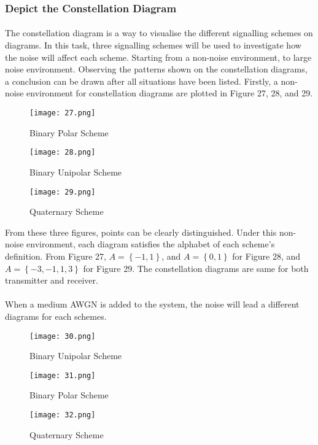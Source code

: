 \documentclass[12pt]{article}
\begin{document}
    \subsubsection{Depict the Constellation Diagram}
    \paragraph{}
    The constellation diagram is a way to visualise the different signalling schemes on diagrams. In this task, three signalling schemes will be used to investigate how the noise will affect each scheme. Starting from a non-noise environment, to large noise environment. Observing the patterns shown on the constellation diagrams, a conclusion can be drawn after all situations have been listed. Firstly, a non-noise environment for constellation diagrams are plotted in Figure 27, 28, and 29.
    \begin{figure}[htbp]
    \begin{minipage}[t]{0.3\linewidth}
    \centering
    \texttt{[image: 27.png]}
    \caption{Binary Polar Scheme}
    \label{fig:side:a}
    \end{minipage}
    \begin{minipage}[t]{0.3\linewidth}
    \centering
    \texttt{[image: 28.png]}
    \caption{Binary Unipolar Scheme}
    \end{minipage}
    \begin{minipage}[t]{0.3\linewidth}
    \centering
    \texttt{[image: 29.png]}
    \caption{Quaternary Scheme}
    \label{}
    \end{minipage}
    \end{figure}
    From these three figures, points can be clearly distinguished. Under this non-noise environment, each diagram satisfies the alphabet of each scheme's definition. From Figure 27, $A=\left \{-1,1 \right \}$, and $A=\left \{0,1 \right \}$ for Figure 28, and $A=\left \{-3,-1,1,3  \right \}$ for Figure 29. The constellation diagrams are same for both transmitter and receiver.
    
    \paragraph{}
    When a medium AWGN is added to the system, the noise will lead a different diagrams for each schemes.
    \begin{figure}[htbp]
    \begin{minipage}[t]{0.3\linewidth}
    \centering
    \texttt{[image: 30.png]}
    \caption{Binary Unipolar Scheme}
    \label{fig:side:a}
    \end{minipage}
    \begin{minipage}[t]{0.3\linewidth}
    \centering
    \texttt{[image: 31.png]}
    \caption{Binary Polar Scheme}
    \end{minipage}
    \begin{minipage}[t]{0.3\linewidth}
    \centering
    \texttt{[image: 32.png]}
    \caption{Quaternary Scheme}
    \label{}
    \end{minipage}
    \end{figure}
\end{document}
